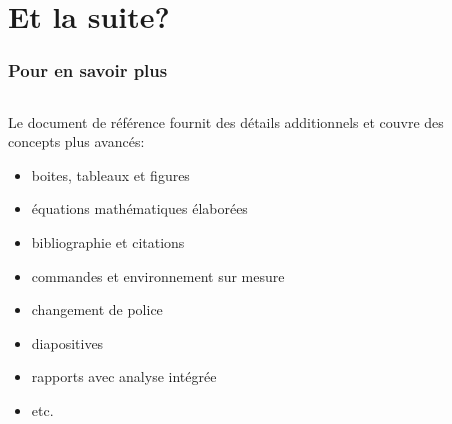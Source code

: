 
\section{Et la suite?}

\begin{frame}
  \frametitle{Pour en savoir plus}

  \begin{columns}
    \begin{column}{.6\textwidth}
      Le document de référence fournit des détails additionnels et
      couvre des concepts plus avancés:
      \begin{itemize}
        \small
      \item boites, tableaux et figures
      \item équations mathématiques élaborées
      \item bibliographie et citations
      \item commandes et environnement sur mesure
      \item changement de police
      \item diapositives
      \item rapports avec analyse intégrée
      \item etc.
      \end{itemize}
    \end{column}
    \begin{column}{.4\textwidth}

\end{column}
\end{columns}
\end{frame}
